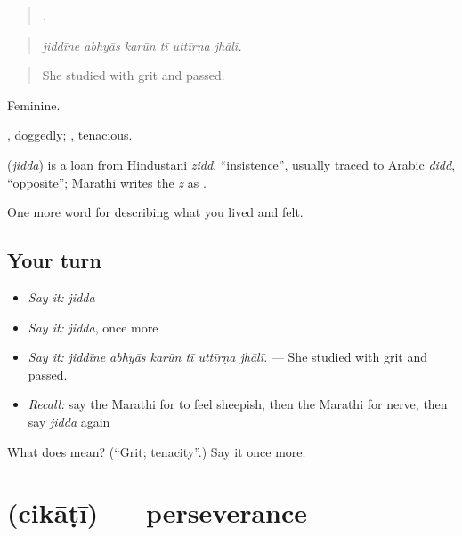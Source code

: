 \begin{quote}
     .
\end{quote}

\begin{quote}
\emph{jiddīne abhyās karūn tī uttīrṇa jhālī.}
\end{quote}

\begin{quote}
She studied with grit and passed.
\end{quote}

Feminine.

, doggedly; , tenacious.

\begin{cousinweb}
\textbf{} (\emph{jidda}) is a loan from Hindustani \emph{zidd}, \textquotedblleft{}insistence\textquotedblright{}, usually traced to Arabic \emph{didd}, \textquotedblleft{}opposite\textquotedblright{}; Marathi writes the \emph{z} as .
\end{cousinweb}

\begin{grammarlens}[title={What you've built}]
One more word for describing what you lived and felt.
\end{grammarlens}

\subsection*{Your turn}
\begin{itemize}
\raggedright
  \item \emph{Say it:} \emph{jidda}
  \item \emph{Say it:} \emph{jidda}, once more
  \item \emph{Say it:} \emph{jiddīne abhyās karūn tī uttīrṇa jhālī.} — She studied with grit and passed.
  \item \emph{Recall:} say the Marathi for to feel sheepish, then the Marathi for nerve, then say \emph{jidda} again
\end{itemize}

\begin{tcolorbox}[breakable,colback=teal!4,colframe=teal!35!black,title={Before you move on}]
What does  mean? (\textquotedblleft{}Grit; tenacity\textquotedblright{}.) Say it once more.
\end{tcolorbox}
\section[\texorpdfstring{\mr{चिकाटी} (cikāṭī)}{चिकाटी (cikāṭī)}]{ (cikāṭī) — perseverance}

